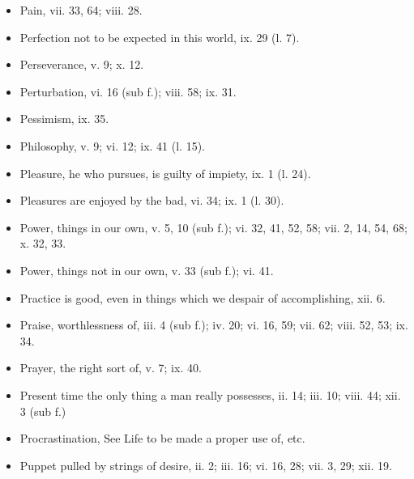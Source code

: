 \begin{itemize}[leftmargin=*]
\setlength\itemsep{0em}
\item
  Pain, vii. 33, 64; viii. 28.
\item
  Perfection not to be expected in this world, ix. 29 (l. 7).
\item
  Perseverance, v. 9; x. 12.
\item
  Perturbation, vi. 16 (sub f.); viii. 58; ix. 31.
\item
  Pessimism, ix. 35.
\item
  Philosophy, v. 9; vi. 12; ix. 41 (l. 15).
\item
  Pleasure, he who pursues, is guilty of impiety, ix. 1 (l. 24).
\item
  Pleasures are enjoyed by the bad, vi. 34; ix. 1 (l. 30).
\item
  Power, things in our own, v. 5, 10 (sub f.); vi. 32, 41, 52, 58; vii.
  2, 14, 54, 68; x. 32, 33.
\item
  Power, things not in our own, v. 33 (sub f.); vi. 41.
\item
  Practice is good, even in things which we despair of accomplishing,
  xii. 6.
\item
  Praise, worthlessness of, iii. 4 (sub f.); iv. 20; vi. 16, 59; vii.
  62; viii. 52, 53; ix. 34.
\item
  Prayer, the right sort of, v. 7; ix. 40.
\item
  Present time the only thing a man really possesses, ii. 14; iii. 10;
  viii. 44; xii. 3 (sub f.)
\item
  Procrastination, See Life to be made a proper use of, etc.
\item
  Puppet pulled by strings of desire, ii. 2; iii. 16; vi. 16, 28; vii.
  3, 29; xii. 19.
\end{itemize}

